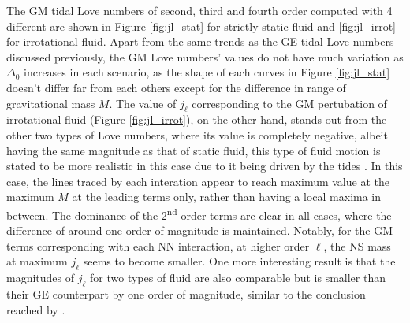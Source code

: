 The \gls{GM} tidal Love numbers of second, third and fourth order computed with 4 different  are shown in Figure \ref{fig:jl_stat} for strictly static fluid and \ref{fig:jl_irrot} for irrotational fluid. Apart from the same trends as the \gls{GE} tidal Love numbers discussed previously, the \gls{GM} Love numbers' values do not have much variation as $\Delta_0$ increases in each scenario, as the shape of each curves in Figure \ref{fig:jl_stat} doesn't differ far from each others except for the difference in range of gravitational mass $M$. The value of $j_\ell$ corresponding to the \gls{GM} pertubation of irrotational fluid (Figure \ref{fig:jl_irrot}), on the other hand, stands out from the other two types of Love numbers, where its value is completely negative, albeit having the same magnitude as that of static fluid, this type of fluid motion is stated to be more realistic in this case due to it being driven by the tides \citep{perot2021role,pani2018magnetic}. In this case, the lines traced by each interation appear to reach maximum value at the maximum $M$ at the leading terms only, rather than having a local maxima in between. The dominance of the 2\textsuperscript{nd} order terms are clear in all cases, where the difference of around one order of magnitude is maintained. Notably, for the \gls{GM} terms corresponding with each \gls{NN} interaction, at higher order $\ell$, the \gls{NS} mass at maximum $j_\ell$ seems to become smaller. One more interesting result is that the magnitudes of $j_\ell$ for two types of fluid are also comparable but is smaller than their \gls{GE} counterpart by one order of magnitude, similar to the conclusion reached by \cite{perot2021role}.
